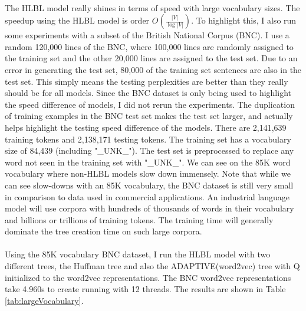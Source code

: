 \paragraph{}
The HLBL model really shines in terms of speed with large vocabulary sizes. The speedup using the HLBL model is order $O(\frac{|V|}{\log|V|})$. To highlight this, I also run some experiments with a subset of the British National Corpus (BNC). I use a random 120,000 lines of the BNC, where 100,000 lines are randomly assigned to the training set and the other 20,000 lines are assigned to the test set. Due to an error in generating the test set, 80,000 of the training set sentences are also in the test set. This simply means the testing perplexities are better than they really should be for all models. Since the BNC dataset is only being used to highlight the speed difference of models, I did not rerun the experiments. The duplication of training examples in the BNC test set makes the test set larger, and actually helps highlight the testing speed difference of the models. There are 2,141,639 training tokens and 2,138,171 testing tokens. The training set has a vocabulary size of 84,439 (including "\_UNK\_"). The test set is preprocessed to replace any word not seen in the training set with "\_UNK\_". We can see on the 85K word vocabulary where non-HLBL models slow down immensely. Note that while we can see slow-downs with an 85K vocabulary, the BNC dataset is still very small in comparison to data used in commercial applications. An industrial language model will use corpora with hundreds of thousands of words in their vocabulary and billions or trillions of training tokens. The training time will generally dominate the tree creation time on such large corpora.

\paragraph{}
Using the 85K vocabulary BNC dataset, I run the HLBL model with two different trees, the Huffman tree and also the ADAPTIVE(word2vec) tree with Q initialized to the word2vec representations. The BNC word2vec representations take 4.960s to create running with 12 threads. The results are shown in Table \ref{tab:largeVocabulary}.
